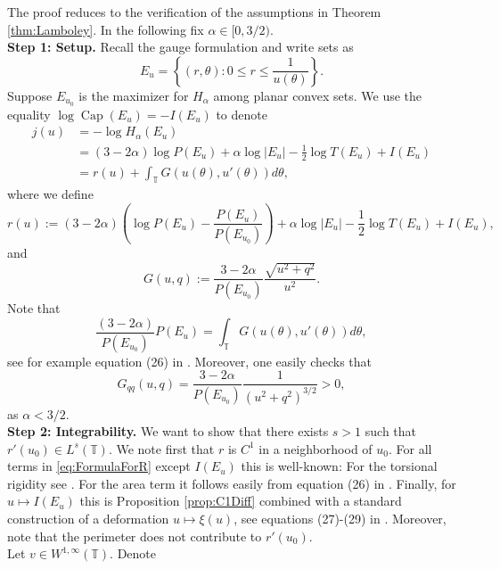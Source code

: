 \documentclass[11pt]{article}
\theoremstyle{plain}
\numberwithin{equation}{section}
\theoremstyle{definition}
\let\oldendproof\endproof
\renewenvironment{proof}[1][\proofname]{%
\oldproof[\upshape \bfseries #1]%
}{\oldendproof}
\DeclareMathOperator{\cp}{Cap}
\def \T{\mathbb{T}}
\def \mb{\mathbb}
\begin{document}
    \begin{proof}[Proof of Theorem \ref{thm:HalphaReg}]
        The proof reduces to the verification of the assumptions in Theorem \ref{thm:Lamboley}. In the following fix $\alpha \in [0,3/2)$.\\
        \textbf{Step 1: Setup.} Recall the gauge formulation and write sets as
        \[
        E_u=\left\{(r,\theta): 0\leq r\leq \frac{1}{u(\theta)}\right\}.
        \]
        Suppose $E_{u_0}$ is the maximizer for $H_\alpha$ among planar convex sets. We use the equality $\log \cp(E_u)=-I(E_u)$ to denote
        \begin{align*}
            j(u)&=-\log H_\alpha(E_u) \\
            &=(3-2\alpha)\log P(E_u)+\alpha\log |E_u|-\frac{1}{2}\log T(E_u)+I(E_u)\\
            &=r(u)+ \int_{\T}G(u(\theta),u'(\theta))d\theta,
        \end{align*}
        where we define
        \begin{equation}
            \label{eq:FormulaForR}
            r(u):= (3-2\alpha)\left(\log P(E_u)-\frac{P(E_u)}{P(E_{u_0})}\right)+\alpha\log |E_u|-\frac{1}{2}\log T(E_u)+I(E_u),
        \end{equation}
        and
        \[
        G(u,q):=\frac{3-2\alpha}{P(E_{u_0})}\frac{\sqrt{u^2+q^2}}{u^2}.
        \]
        Note that
        \[
        \frac{(3-2\alpha)}{P(E_{u_0})}P(E_u)=\int_{\T}G(u(\theta),u'(\theta))d\theta,
        \]
        see for example equation (26) in \cite{lamboley2012regularity}.
        Moreover, one easily checks that
        \[
        G_{qq}(u,q)= \frac{3-2\alpha}{P(E_{u_0})}\frac{1}{(u^2+q^2)^{3/2}}>0,
        \]
        as $\alpha <3/2$.\\
        \textbf{Step 2: Integrability.} We want to show that there exists $s>1$ such that $r'(u_0)\in L^s(\mb T)$. We note first that $r$ is $C^1$ in a neighborhood of $u_0$. For all terms in \eqref{eq:FormulaForR} except $I(E_u)$ this is well-known: For the torsional rigidity see \cite[Proposition 3.13]{lamboley2012regularity}. For the area term it follows easily from equation (26) in \cite{lamboley2012regularity}. Finally, for $u \mapsto I(E_u)$ this is Proposition \ref{prop:C1Diff} combined with a standard construction of a deformation $u \mapsto \xi(u)$, see equations (27)-(29) in \cite{lamboley2012regularity}. Moreover, note that the perimeter does not contribute to $r'(u_0)$.\\
        Let $v \in W^{1,\infty}(\mb T)$. Denote
        \[
\]
\end{proof}
\end{document}
